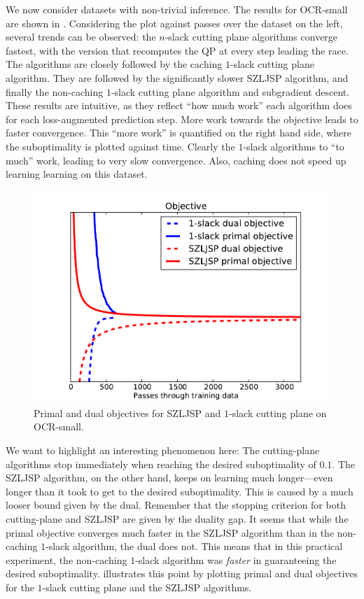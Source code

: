 We now consider datasets with non-trivial inference.
The results for OCR-small are shown in .
Considering the plot against passes over the dataset on the left, several
trends can be observed: the $n$-slack cutting plane algorithms converge
fastest, with the version that recomputes the QP at every step leading the
race. The algorithms are closely followed by the caching $1$-slack cutting
plane algorithm.  They are followed by the significantly slower SZLJSP
algorithm, and finally the non-caching $1$-slack cutting plane algorithm and
subgradient descent.  These results are intuitive, as they reflect ``how much
work'' each algorithm does for each loss-augmented prediction step. More work
towards the objective leads to faster convergence.  This ``more work'' is
quantified on the right hand side, where the suboptimality is plotted against time.
Clearly the $1$-slack algorithms to ``to much'' work, leading to very slow
convergence.  Also, caching does not speed up learning learning on this
dataset.


\begin{figure}
    \begin{center}
    \includegraphics[width=.5\linewidth]{evaluation/images/letters_small_dual}
\end{center}
\caption{%
    Primal and dual objectives for SZLJSP and $1$-slack cutting plane on OCR-small.
}
\end{figure}

We want to highlight an interesting phenomenon here: The cutting-plane algorithms stop immediately
when reaching the desired suboptimality of $0.1$. The SZLJSP algorithm, on the other hand, keeps
on learning much longer---even longer than it took to get to the desired suboptimality. This is caused
by a much looser bound given by the dual. Remember that the stopping criterion for both cutting-plane 
and SZLJSP are given by the duality gap. It seems that while the primal objective converges much
faster in the SZLJSP algorithm than in the non-caching $1$-slack algorithm, the dual does not.
This means that in this practical experiment, the non-caching $1$-slack algorithm was \emph{faster}
in guaranteeing the desired suboptimality.
 illustrates this point by plotting primal and dual
objectives for the $1$-slack cutting plane and the SZLJSP algorithms.

